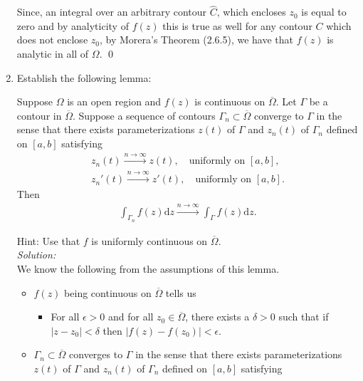 \documentclass[10pt]{amsart}
\newcommand{\D}{\mathrm{d}}
\theoremstyle{nonumberplain}
\begin{document}
\begin{enumerate}[label={\bf {\arabic*}:}]
\noindent
Since, an integral over an arbitrary contour $\widehat C$, which encloses $z_0$ is equal to zero and by analyticity of $f(z)$ this is true as well for any contour $C$ which does not enclose $z_0$, by Morera's Theorem (2.6.5), we have that $f(z)$ is analytic in all of $\Omega$.
\qed \\

\newpage
\item Establish the following lemma:\\
    \begin{lemma}
      Suppose $\Omega$ is an open region and $f(z)$ is continuous on
      $\overline \Omega$.  Let $\Gamma$ be a contour in $\overline
      \Omega$.  Suppose a sequence of contours $\Gamma_n \subset
      \overline \Omega$ converge to
      $\Gamma$ in the sense that there exists parameterizations $z(t)$
      of $\Gamma$ and $z_n(t)$ of $\Gamma_n$ defined on $[a,b]$
      satisfying
      \begin{align*}
        z_n(t) \overset{n \to \infty}{\longrightarrow} z(t),  \quad \text{
        uniformly on } [a,b],\\
        z_n'(t) \overset{n \to \infty}{\longrightarrow} z'(t), \quad \text{
        uniformly on } [a,b].
      \end{align*}
      Then
      \begin{align*}
        \int_{\Gamma_n} f(z) \D z \overset{n \to
        \infty}{\longrightarrow}   \int_{\Gamma} f(z) \D z.
      \end{align*}
    \end{lemma}
    Hint: Use that $f$ is uniformly continuous on $\overline \Omega$.\\
\textit{Solution:} \\
We know the following from the assumptions of this lemma.
\begin{itemize}
\item $f(z)$ being continuous on $\overline \Omega$ tells us
\begin{itemize}
\item For all $\epsilon > 0$ and for all $z_0 \in \overline \Omega$, there exists a $\delta > 0$ such that if $|z - z_0| < \delta$ then $|f(z) - f(z_0)| < \epsilon$.
\end{itemize}
\item $\Gamma_n \subset \overline \Omega$ converges to $\Gamma$ in the sense that there exists parameterizations $z(t)$
      of $\Gamma$ and $z_n(t)$ of $\Gamma_n$ defined on $[a,b]$
      satisfying
      \begin{align*}

\end{align*}
\end{itemize}
\end{enumerate}
\end{document}
